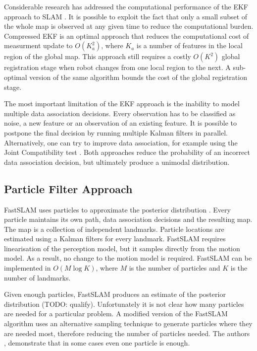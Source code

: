 Considerable research has addressed the computational performance of
the EKF approach to SLAM \cite{williams:acra2001, williams2001esa,
  knight2001tct, guivant01, tim_bailey, uhlmann97nondivergent,
  tardos02:_mappin_local_indoor_envir_using_sonar_data}.  It is
possible to exploit the fact that only a small subset of the whole map
is observed at any given time to reduce the computational burden.
Compressed EKF \cite{williams:acra2001} is an optimal approach that
reduces the computational cost of measurment update to $O(K_a^2)$,
where $K_a$ is a number of features in the local region of the global
map.  This approach still requires a costly $O(K^2)$ global
registration stage when robot changes from one local region to the
next. A sub-optimal version of the same algorithm bounds the cost of the
global registration stage.


The most important limitation of the EKF approach is the inability to
model multiple data association decisions. Every observation has to be
classified as noise, a new feature or an observation of an
existing feature.  It is possible to postpone the final decision by
running multiple Kalman filters in parallel. Alternatively, one can try
to improve data association, for example using the Joint Compatibility
test \cite{neira01:_data_assoc_stoch_mappin_using}.  Both approaches
reduce the probability of an incorrect data association decision, but
ultimately produce a unimodal distribution.

\subsection{Particle Filter Approach}
FastSLAM uses particles to approximate the posterior distribution
\cite{fastslam}. Every particle maintains its own path, data
association decisions and the resulting map. The map is a collection
of independent landmarks. Particle locations are estimated using a
Kalman filters for every landmark. FastSLAM requires linearisation of
the perception model, but it samples directly from the motion model.
As a result, no change to the motion model is required. FastSLAM can
be implemented in $O(M\log K)$, where $M$ is the number of particles
and $K$ is the number of landmarks.

Given enough particles, FastSLAM produces an estimate of the posterior
distribution (TODO: qualify). Unfortunately it is not clear how many
particles are needed for a particular problem. A modified version of
the FastSLAM algorithm \cite{fastslam2} uses an alternative sampling
technique to generate particles where they are needed most, therefore
reducing the number of particles needed. The authors \cite{fastslam2},
demonstrate that in some cases even one particle is enough.


